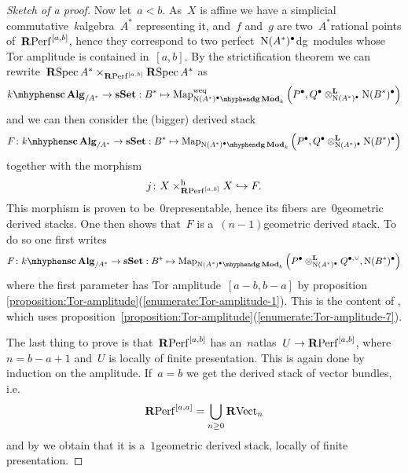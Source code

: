\begin{refsection}
\begin{theorem}
\begin{proof}[Sketch of a proof]
    Now let~$a<b$. As~$X$ is affine we have a simplicial commutative~$k$\dash algebra~$A^*$ representing it, and~$f$ and~$g$ are two~$A^*$\dash rational points of~$\mathbf{R}\mathrm{Perf}^{[a,b]}$, hence they correspond to two perfect~$\operatorname{N}(A^*)^\bullet$\dash dg~modules whose Tor amplitude is contained in~$[a,b]$. By the strictification theorem \cite[appendix B]{toen-vezzosi-hag-II} we can rewrite~$\operatorname{\mathbf{R}Spec} A^*\times_{\mathbf{R}\mathrm{Perf}^{[a,b]}}\operatorname{\mathbf{R}Spec} A^*$ as
    \begin{equation}
      \scAlg{k}_{/A^*}\to\sSet:B^*\mapsto\Map_{\dgMod{\nerve(A^*)^\bullet}_k}^{\mathrm{weq}}\left( P^\bullet,Q^\bullet\otimes_{\nerve(A^*)^\bullet}^{\mathbf{L}}\nerve(B^*)^\bullet \right)
    \end{equation}
    and we can then consider the (bigger) derived stack
    \begin{equation}
      F\colon\scAlg{k}_{/A^*}\to\sSet:B^*\mapsto\Map_{\dgMod{\nerve(A^*)^\bullet}_k}\left( P^\bullet,Q^\bullet\otimes_{\nerve(A^*)^\bullet}^{\mathbf{L}}\nerve(B^*)^\bullet \right)
    \end{equation}
    together with the morphism
    \begin{equation}
      j\colon X\times_{\mathbf{R}\mathrm{Perf}^{[a,b]}}^{\mathrm{h}}X\hookrightarrow F.
    \end{equation}
    This morphism is proven to be~$0$\dash representable, hence its fibers are~$0$\dash geometric derived stacks. One then shows that~$F$ is a~$(n-1)$\dash geometric derived stack. To do so one first writes
    \begin{equation}
      F\colon\scAlg{k}_{/A^*}\to\sSet:B^*\mapsto\Map_{\dgMod{\nerve(A^*)^\bullet}_k}\left( P^\bullet\otimes_{\nerve(A^*)^\bullet}^{\mathbf{L}}Q^{\bullet,\vee},\nerve(B^*)^\bullet \right)
    \end{equation}
    where the first parameter has Tor amplitude~$[a-b,b-a]$ by proposition \ref{proposition:Tor-amplitude}(\ref{enumerate:Tor-amplitude-1}). This is the content of \cite[sublemma 3.9]{toen-vaquie-moduli-of-objects-in-dg-categories}, which uses proposition~\ref{proposition:Tor-amplitude}(\ref{enumerate:Tor-amplitude-7}).

    The last thing to prove is that~$\mathbf{R}\mathrm{Perf}^{[a,b]}$ has an~$n$\dash atlas~$U\to\mathbf{R}\mathrm{Perf}^{[a,b]}$, where~$n=b-a+1$ and~$U$ is locally of finite presentation. This is again done by induction on the amplitude. If~$a=b$ we get the derived stack of vector bundles, i.e.\
    \begin{equation}
      \mathbf{R}\mathrm{Perf}^{[a,a]}=\bigcup_{n\geq 0}\mathbf{R}\mathrm{Vect}_n
    \end{equation}
    and by \cite[corollary 1.3.7.4]{toen-vezzosi-hag-II} we obtain that it is a~$1$\dash geometric derived stack, locally of finite presentation.


\end{proof}
\end{theorem}
\end{refsection}
